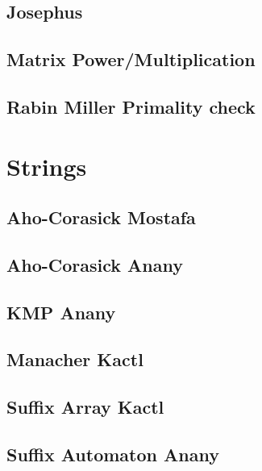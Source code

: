 \subsection{Josephus}
\raggedbottom
\hrulefill
\subsection{Matrix Power/Multiplication}
\raggedbottom
\hrulefill
\subsection{Rabin Miller Primality check}
\raggedbottom
\hrulefill

\section{Strings}
\subsection{Aho-Corasick Mostafa}
\raggedbottom
\hrulefill
\subsection{Aho-Corasick Anany}
\raggedbottom
\hrulefill
\subsection{KMP Anany}
\raggedbottom
\hrulefill
\subsection{Manacher Kactl}
\raggedbottom
\hrulefill
\subsection{Suffix Array Kactl}
\raggedbottom
\hrulefill
\subsection{Suffix Automaton Anany}
\raggedbottom
\hrulefill
